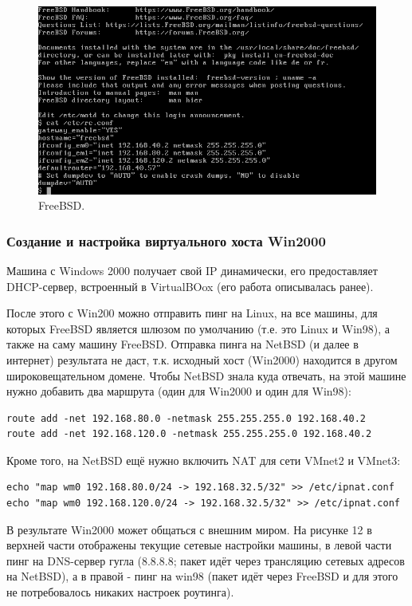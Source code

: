 \begin{figure}[h!]
\centering
\includegraphics[scale=0.9]{res/freebsd-general}
\caption{FreeBSD.}
\end{figure}

\subsubsection{Создание и настройка виртуального хоста Win2000}

Машина с Windows 2000 получает свой IP динамически, его предоставляет DHCP-сервер, встроенный в VirtualBOox (его работа описывалась ранее).

После этого с Win200 можно отправить пинг на Linux, на все машины, для которых FreeBSD является шлюзом по умолчанию (т.е. это Linux и Win98), а также на саму машину FreeBSD. Отправка пинга на NetBSD (и далее в интернет) результата не даст, т.к. исходный хост (Win2000) находится в другом широковещательном домене. Чтобы NetBSD знала куда отвечать, на этой машине нужно добавить два маршрута (один для Win2000 и один для Win98):
\begin{Verbatim}[frame=single]
route add -net 192.168.80.0 -netmask 255.255.255.0 192.168.40.2
route add -net 192.168.120.0 -netmask 255.255.255.0 192.168.40.2
\end{Verbatim}

Кроме того, на NetBSD ещё нужно включить NAT для сети VMnet2 и VMnet3:
\begin{Verbatim}[frame=single]
echo "map wm0 192.168.80.0/24 -> 192.168.32.5/32" >> /etc/ipnat.conf
echo "map wm0 192.168.120.0/24 -> 192.168.32.5/32" >> /etc/ipnat.conf
\end{Verbatim}

В результате Win2000 может общаться с внешним миром. На рисунке 12 в верхней части отображены текущие сетевые настройки машины, в левой части пинг на DNS-сервер гугла (8.8.8.8; пакет идёт через трансляцию сетевых адресов на NetBSD), а в правой - пинг на win98 (пакет идёт через FreeBSD и для этого не потребовалось никаких настроек роутинга).


